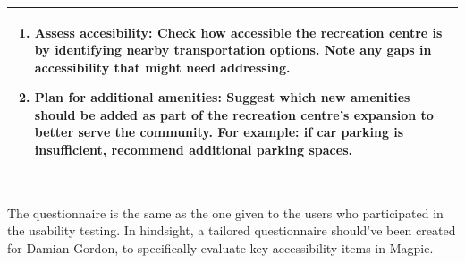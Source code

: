 \begin{table}[h!]
\begin{tabular}{|p{}|}
\begin{enumerate}
            \item \textbf{Assess accesibility:} Check how accessible the recreation centre is by identifying nearby transportation options. Note any gaps in accessibility that might need addressing.
            \item \textbf{Plan for additional amenities:} Suggest which new amenities should be added as part of the recreation centre's expansion to better serve the community. For example: if car parking is insufficient, recommend additional parking spaces.
        \end{enumerate}                                              \\
        \hline
    \end{tabular}
\end{table}
\\
The questionnaire is the same as the one given to the users who participated in the usability testing. In hindsight, a tailored questionnaire should've been created for Damian Gordon, to specifically evaluate key accessibility items in Magpie.

